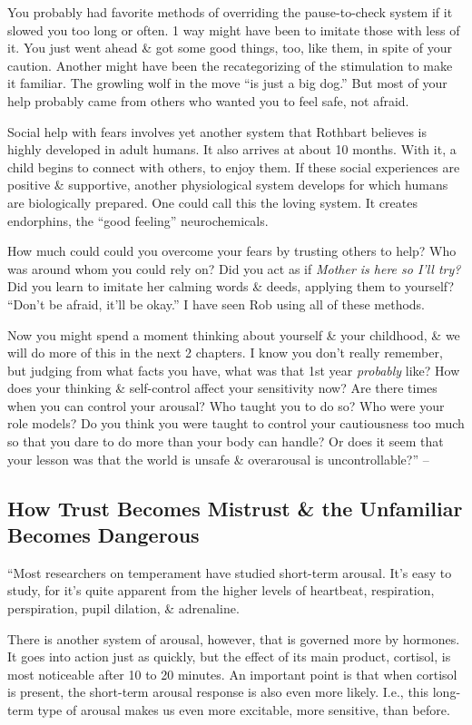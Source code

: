 \documentclass{article}
\numberwithin{equation}{section}
\begin{document}
You probably had favorite methods of overriding the pause-to-check system if it slowed you too long or often. 1 way might have been to imitate those with less of it. You just went ahead \& got some good things, too, like them, in spite of your caution. Another might have been the recategorizing of the stimulation to make it familiar. The growling wolf in the move ``is just a big dog.'' But most of your help probably came from others who wanted you to feel safe, not afraid.

Social help with fears involves yet another system that Rothbart believes is highly developed in adult humans. It also arrives at about 10 months. With it, a child begins to connect with others, to enjoy them. If these social experiences are positive \& supportive, another physiological system develops for which humans are biologically prepared. One could call this the loving system. It creates endorphins, the ``good feeling'' neurochemicals.

How much could could you overcome your fears by trusting others to help? Who was around whom you could rely on? Did you act as if \textit{Mother is here so I'll try?} Did you learn to imitate her calming words \& deeds, applying them to yourself? ``Don't be afraid, it'll be okay.'' I have seen Rob using all of these methods.

Now you might spend a moment thinking about yourself \& your childhood, \& we will do more of this in the next 2 chapters. I know you don't really remember, but judging from what facts you have, what was that 1st year \textit{probably} like? How does your thinking \& self-control affect your sensitivity now? Are there times when you can control your arousal? Who taught you to do so? Who were your role models? Do you think you were taught to control your cautiousness too much so that you dare to do more than your body can handle? Or does it seem that your lesson was that the world is unsafe \& overarousal is uncontrollable?'' -- \cite[pp. 65--67]{Aron2013}

\subsection{How Trust Becomes Mistrust \& the Unfamiliar Becomes Dangerous}
``Most researchers on temperament have studied short-term arousal. It's easy to study, for it's quite apparent from the higher levels of heartbeat, respiration, perspiration, pupil dilation, \& adrenaline.

There is another system of arousal, however, that is governed more by hormones. It goes into action just as quickly, but the effect of its main product, cortisol, is most noticeable after 10 to 20 minutes. An important point is that when cortisol is present, the short-term arousal response is also even more likely. I.e., this long-term type of arousal makes us even more excitable, more sensitive, than before.
\end{document}
